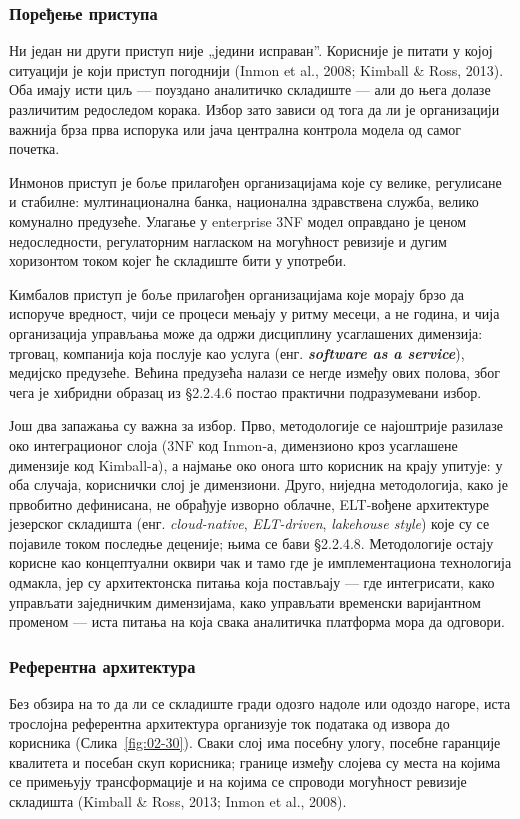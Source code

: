 \subsubsection{Поређење приступа}
Ни један ни други приступ није „једини исправан”. Корисније је питати у којој ситуацији је који приступ погоднији (Inmon et al., 2008; Kimball \& Ross, 2013). Оба имају исти циљ — поуздано аналитичко складиште — али до њега долазе различитим редоследом корака. Избор зато зависи од тога да ли је организацији важнија брза прва испорука или јача централна контрола модела од самог почетка.

Инмонов приступ је боље прилагођен организацијама које су велике, регулисане и стабилне: мултинационална банка, национална здравствена служба, велико комунално предузеће. Улагање у enterprise 3NF модел оправдано је ценом недоследности, регулаторним нагласком на могућност ревизије и дугим хоризонтом током којег ће складиште бити у употреби.

Кимбалов приступ је боље прилагођен организацијама које морају брзо да испоруче вредност, чији се процеси мењају у ритму месеци, а не година, и чија организација управљања може да одржи дисциплину усаглашених димензија: трговац, компанија која послује као услуга (енг. \textbf{\textit{software as a service}}), медијско предузеће. Већина предузећа налази се негде између ових полова, због чега је хибридни образац из §2.2.4.6 постао практични подразумевани избор.

Још два запажања су важна за избор. Прво, методологије се најоштрије разилазе око интеграционог слоја (3NF код Inmon-а, димензионо кроз усаглашене димензије код Kimball-а), а најмање око онога што корисник на крају упитује: у оба случаја, кориснички слој је димензиони. Друго, ниједна методологија, како је првобитно дефинисана, не обрађује изворно облачне, ELT-вођене архитектуре језерског складишта (енг. \textit{cloud-native}, \textit{ELT-driven}, \textit{lakehouse style}) које су се појавиле током последње деценије; њима се бави §2.2.4.8. Методологије остају корисне као концептуални оквири чак и тамо где је имплементациона технологија одмакла, јер су архитектонска питања која постављају — где интегрисати, како управљати заједничким димензијама, како управљати временски варијантном променом — иста питања на која свака аналитичка платформа мора да одговори.

\subsubsection{Референтна архитектура}
Без обзира на то да ли се складиште гради одозго надоле или одоздо нагоре, иста трослојна референтна архитектура организује ток података од извора до корисника (Слика~\ref{fig:02-30}). Сваки слој има посебну улогу, посебне гаранције квалитета и посебан скуп корисника; границе између слојева су места на којима се примењују трансформације и на којима се спроводи могућност ревизије складишта (Kimball \& Ross, 2013; Inmon et al., 2008).

